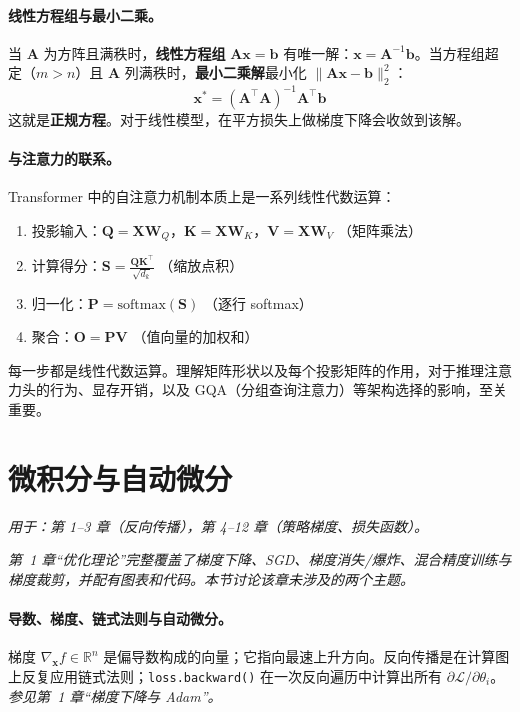 \paragraph{线性方程组与最小二乘。}
当 $\mathbf{A}$ 为方阵且满秩时，\textbf{线性方程组} $\mathbf{A}\mathbf{x} = \mathbf{b}$ 有唯一解：$\mathbf{x} = \mathbf{A}^{-1}\mathbf{b}$。当方程组超定（$m > n$）且 $\mathbf{A}$ 列满秩时，\textbf{最小二乘解}最小化 $\|\mathbf{A}\mathbf{x} - \mathbf{b}\|_2^2$：
\[
\mathbf{x}^* = (\mathbf{A}^\top\mathbf{A})^{-1}\mathbf{A}^\top\mathbf{b}
\]
这就是\textbf{正规方程}。对于线性模型，在平方损失上做梯度下降会收敛到该解。

\paragraph{与注意力的联系。}
Transformer 中的自注意力机制本质上是一系列线性代数运算：
\begin{enumerate}
  \item 投影输入：$\mathbf{Q} = \mathbf{X}\mathbf{W}_Q$，$\mathbf{K} = \mathbf{X}\mathbf{W}_K$，$\mathbf{V} = \mathbf{X}\mathbf{W}_V$ \quad（矩阵乘法）
  \item 计算得分：$\mathbf{S} = \frac{\mathbf{Q}\mathbf{K}^\top}{\sqrt{d_k}}$ \quad（缩放点积）
  \item 归一化：$\mathbf{P} = \mathrm{softmax}(\mathbf{S})$ \quad（逐行 softmax）
  \item 聚合：$\mathbf{O} = \mathbf{P}\mathbf{V}$ \quad（值向量的加权和）
\end{enumerate}
每一步都是线性代数运算。理解矩阵形状以及每个投影矩阵的作用，对于推理注意力头的行为、显存开销，以及 GQA（分组查询注意力）等架构选择的影响，至关重要。

\section{微积分与自动微分}
\label{app:calculus}

\emph{用于：第 1--3 章（反向传播），第 4--12 章（策略梯度、损失函数）。}

\emph{第~1 章“优化理论”完整覆盖了梯度下降、SGD、梯度消失/爆炸、混合精度训练与梯度裁剪，并配有图表和代码。本节讨论该章未涉及的两个主题。}

\paragraph{导数、梯度、链式法则与自动微分。}
梯度 $\nabla_{\mathbf{x}} f \in \mathbb{R}^n$ 是偏导数构成的向量；它指向最速上升方向。反向传播是在计算图上反复应用链式法则；\texttt{loss.backward()} 在一次反向遍历中计算出所有 $\partial\mathcal{L}/\partial\theta_i$。\emph{参见第~1 章“梯度下降与 Adam”。}

